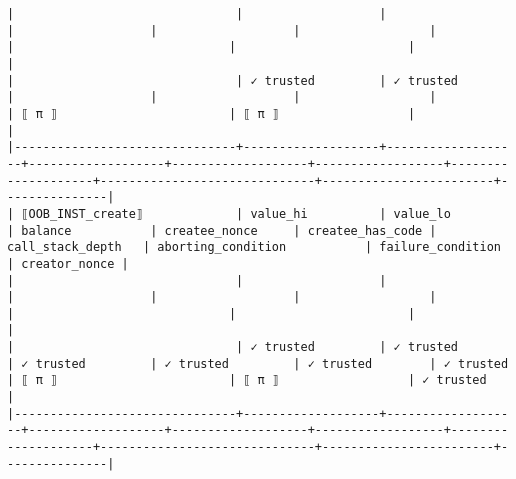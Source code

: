\documentclass[varwidth=\maxdimen,margin=0.5cm,multi={verbatim}]{standalone}
\begin{document}
\begin{verbatim}
|                               |                   |                   |                   |                   |                  |                    |                              |                        |               |
|                               | ✓ trusted         | ✓ trusted         |                   |                   |                  |                    | ⟦ π ⟧                        | ⟦ π ⟧                  |               |
|-------------------------------+-------------------+-------------------+-------------------+-------------------+------------------+--------------------+------------------------------+------------------------+---------------|
| ⟦OOB_INST_create⟧             | value_hi          | value_lo          | balance           | createe_nonce     | createe_has_code | call_stack_depth   | aborting_condition           | failure_condition      | creator_nonce |
|                               |                   |                   |                   |                   |                  |                    |                              |                        |               |
|                               | ✓ trusted         | ✓ trusted         | ✓ trusted         | ✓ trusted         | ✓ trusted        | ✓ trusted          | ⟦ π ⟧                        | ⟦ π ⟧                  | ✓ trusted     |
|-------------------------------+-------------------+-------------------+-------------------+-------------------+------------------+--------------------+------------------------------+------------------------+---------------|

\end{verbatim}
\end{document}
